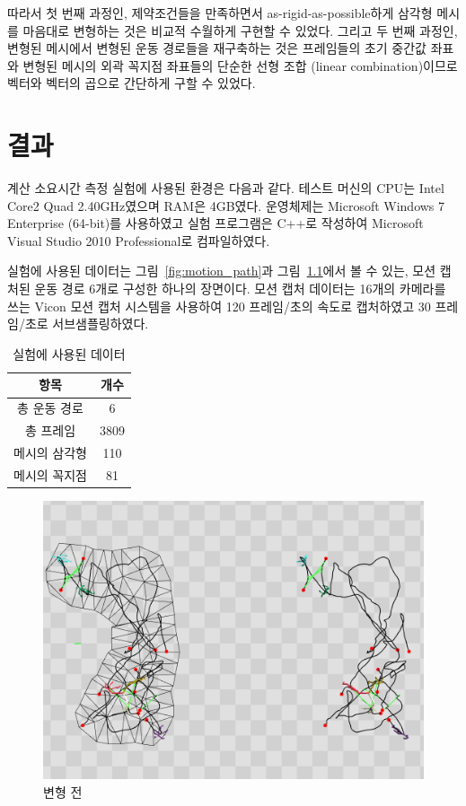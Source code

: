 \documentclass[12pt,a4paper,oneside,final]{report}
\begin{document}
따라서 첫 번째 과정인, 제약조건들을 만족하면서 as-rigid-as-possible하게 삼각형
메시를 마음대로 변형하는 것은 비교적 수월하게 구현할 수 있었다. 그리고 두
번째 과정인, 변형된 메시에서 변형된 운동 경로들을 재구축하는 것은 프레임들의
초기 중간값 좌표와 변형된 메시의 외곽 꼭지점 좌표들의 단순한 선형 조합 (linear
combination)이므로 벡터와 벡터의 곱으로 간단하게 구할 수 있었다.

\chapter{결과}
계산 소요시간 측정 실험에 사용된 환경은 다음과 같다. 테스트 머신의 CPU는 Intel
Core2 Quad 2.40GHz였으며 RAM은 4GB였다. 운영체제는 Microsoft Windows 7
Enterprise (64-bit)를 사용하였고 실험 프로그램은 C++로 작성하여 Microsoft
Visual Studio 2010 Professional로 컴파일하였다.

실험에 사용된 데이터는 그림~\ref{fig:motion_path}과
그림~\ref{fig:before_deform}에서 볼 수 있는, 모션 캡처된 운동 경로 6개로 구성한
하나의 장면이다. 모션 캡처 데이터는 16개의 카메라를 쓰는 Vicon 모션 캡처
시스템을 사용하여 120 프레임/초의 속도로 캡처하였고 30 프레임/초로
서브샘플링하였다.

\begin{table}[ht]
\centering
\begin{tabular}{c|c}
\hline
항목 & 개수 \\
\hline
총 운동 경로 & 6 \\
총 프레임 & 3809 \\
메시의 삼각형 & 110 \\
메시의 꼭지점 & 81 \\
\hline
\end{tabular}
\caption{실험에 사용된 데이터}
\label{table:data}
\end{table}

\begin{figure}[p]
\centering
\includegraphics[width=0.9\linewidth]{before_deform_c.png}
\caption{변형 전}
\label{fig:before_deform}
\end{figure}
\end{document}
